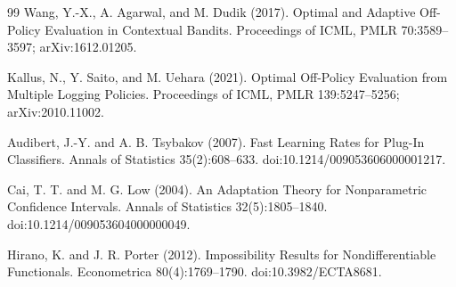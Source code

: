 \documentclass{article}
\begin{document}
\begin{thebibliography}{99}
   Wang, Y.-X., A. Agarwal, and M. Dudik (2017). Optimal and Adaptive Off-Policy Evaluation in Contextual Bandits. Proceedings of ICML, PMLR 70:3589--3597; arXiv:1612.01205.

   Kallus, N., Y. Saito, and M. Uehara (2021). Optimal Off-Policy Evaluation from Multiple Logging Policies. Proceedings of ICML, PMLR 139:5247--5256; arXiv:2010.11002.

   Audibert, J.-Y. and A. B. Tsybakov (2007). Fast Learning Rates for Plug-In Classifiers. Annals of Statistics 35(2):608--633. doi:10.1214/009053606000001217.

   Cai, T. T. and M. G. Low (2004). An Adaptation Theory for Nonparametric Confidence Intervals. Annals of Statistics 32(5):1805--1840. doi:10.1214/009053604000000049.

   Hirano, K. and J. R. Porter (2012). Impossibility Results for Nondifferentiable Functionals. Econometrica 80(4):1769--1790. doi:10.3982/ECTA8681.

\end{thebibliography}
\end{document}
